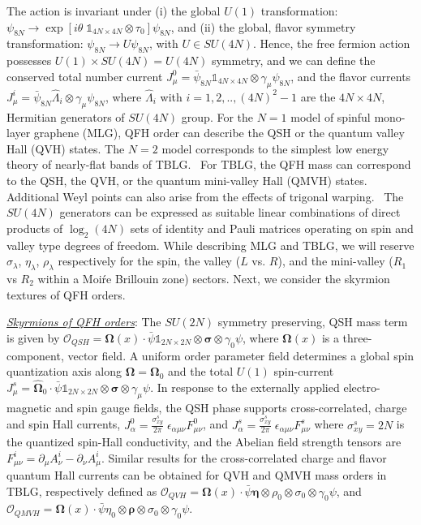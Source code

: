 \documentclass[aps,prb,amsmath,amssymb,floatfix,twocolumn]{revtex4}
\begin{document}
The action is invariant under (i) the global $U(1)$ transformation: $\psi_{8N} \to \exp[i \theta \; \mathbb{1}_{4N \times 4N} \otimes \tau_0] \psi_{8N}$,  and (ii) the global, flavor symmetry transformation: $\psi_{8N} \to U \psi_{8N}$, with $U \in SU(4N)$. Hence, the free fermion action possesses $U(1) \times SU(4N)=U(4N)$ symmetry, and we can define the conserved total number current $J^0_{\mu} =\bar{\psi}_{8N} \mathbb{1}_{4N \times 4N} \otimes \gamma_\mu \psi_{8N}$, and the flavor currents 
$
J^i_{\mu}= \bar{\psi}_{8N} \hat{\Lambda}_{i} \otimes \gamma_\mu  \psi_{8N}$, 
where $\hat{\Lambda}_i$ with $i=1,2,..,(4N)^2-1$ are the $4N \times 4N$, Hermitian generators of $SU(4N)$ group. 
For the $N=1$ model of spinful mono-layer graphene (MLG), QFH order can describe the QSH or the quantum valley Hall (QVH) states. The $N=2$ model corresponds to the simplest low energy theory of nearly-flat bands of TBLG.~\cite{Bistritzer,Gail,Santos,Po} For TBLG, the QFH mass can correspond to the QSH, the QVH, or the quantum mini-valley Hall (QMVH) states. Additional Weyl points can also arise from the effects of trigonal warping.~\cite{Geim} The $SU(4N)$ generators can be expressed as suitable linear combinations of direct products of $\log_2(4N)$ sets of identity and Pauli matrices operating on spin and valley type degrees of freedom. While describing MLG and TBLG, we will reserve $\sigma_\lambda$, $\eta_\lambda$, $\rho_\lambda$ respectively for the spin, the valley ($L$ vs. $R$), and the mini-valley ($R_1$ vs $R_2$ within a Moi\'re Brillouin zone) sectors. Next, we consider the skyrmion textures of QFH orders. 


\underline{\emph{Skyrmions of QFH orders}}: The $SU(2N)$ symmetry preserving, QSH mass term is given by
$\mathcal{O}_{QSH}= \mathbf{\Omega} (x) \cdot \bar{\psi} \mathbb{1}_{2N \times 2N} \otimes \boldsymbol \sigma \otimes \gamma_0 \psi$, 
where $\mathbf{\Omega}(x)$ is a three-component, vector field. A uniform order parameter field determines a global spin quantization axis along $\mathbf{\Omega}=\mathbf{\Omega}_0$ and the total $U(1)$ spin-current $J^s_{\mu}= \hat{\mathbf{\Omega}}_0 \cdot \bar{\psi} \mathbb{1}_{2N \times 2N} \otimes \boldsymbol \sigma \otimes \gamma_\mu \psi$. In response to the externally applied electro-magnetic and spin gauge fields, the QSH phase supports cross-correlated, charge and spin Hall currents, $J^0_{\alpha}=\frac{\sigma_{xy}^{s}}{2\pi} \;  \epsilon_{\alpha \mu \nu} F^0_{\mu \nu}$, and $J^s_{\alpha}=\frac{\sigma_{xy}^{s}}{2\pi} \;  \epsilon_{\alpha \mu \nu} F^s_{\mu \nu}$
where $\sigma^{s}_{xy} =  2N$ is the quantized spin-Hall conductivity, and the Abelian field strength tensors are $F^i_{\mu \nu}=\partial_\mu A^i_\nu - \partial_\nu A^i_\mu$. 
Similar results for the cross-correlated charge and flavor quantum Hall currents can be obtained for QVH and QMVH mass orders in TBLG,  respectively defined as
$\mathcal{O}_{QVH} = \mathbf{\Omega} (x) \cdot \bar{\psi} \boldsymbol \eta \otimes \rho_0 \otimes \sigma_0  \otimes \gamma_0 \psi$, and 
$\mathcal{O}_{QMVH} = \mathbf{\Omega} (x) \cdot \bar{\psi} \eta_0 \otimes \boldsymbol \rho \otimes \sigma_0  \otimes \gamma_0 \psi$. 
 
\end{document}
